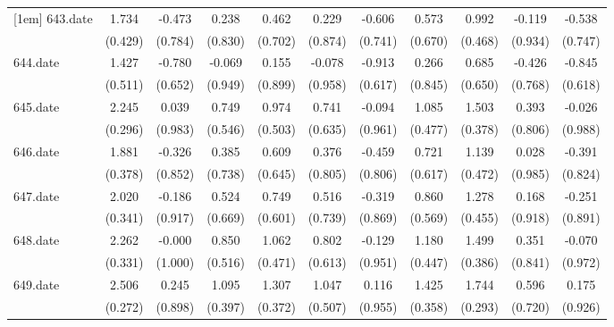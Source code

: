 \begin{tabular}{l*{10}{c}}
[1em]
643.date    &       1.734&      -0.473&       0.238&       0.462&       0.229&      -0.606&       0.573&       0.992&      -0.119&      -0.538\\
            &     (0.429)&     (0.784)&     (0.830)&     (0.702)&     (0.874)&     (0.741)&     (0.670)&     (0.468)&     (0.934)&     (0.747)\\
[1em]
644.date    &       1.427&      -0.780&      -0.069&       0.155&      -0.078&      -0.913&       0.266&       0.685&      -0.426&      -0.845\\
            &     (0.511)&     (0.652)&     (0.949)&     (0.899)&     (0.958)&     (0.617)&     (0.845)&     (0.650)&     (0.768)&     (0.618)\\
[1em]
645.date    &       2.245&       0.039&       0.749&       0.974&       0.741&      -0.094&       1.085&       1.503&       0.393&      -0.026\\
            &     (0.296)&     (0.983)&     (0.546)&     (0.503)&     (0.635)&     (0.961)&     (0.477)&     (0.378)&     (0.806)&     (0.988)\\
[1em]
646.date    &       1.881&      -0.326&       0.385&       0.609&       0.376&      -0.459&       0.721&       1.139&       0.028&      -0.391\\
            &     (0.378)&     (0.852)&     (0.738)&     (0.645)&     (0.805)&     (0.806)&     (0.617)&     (0.472)&     (0.985)&     (0.824)\\
[1em]
647.date    &       2.020&      -0.186&       0.524&       0.749&       0.516&      -0.319&       0.860&       1.278&       0.168&      -0.251\\
            &     (0.341)&     (0.917)&     (0.669)&     (0.601)&     (0.739)&     (0.869)&     (0.569)&     (0.455)&     (0.918)&     (0.891)\\
[1em]
648.date    &       2.262&      -0.000&       0.850&       1.062&       0.802&      -0.129&       1.180&       1.499&       0.351&      -0.070\\
            &     (0.331)&     (1.000)&     (0.516)&     (0.471)&     (0.613)&     (0.951)&     (0.447)&     (0.386)&     (0.841)&     (0.972)\\
[1em]
649.date    &       2.506&       0.245&       1.095&       1.307&       1.047&       0.116&       1.425&       1.744&       0.596&       0.175\\
            &     (0.272)&     (0.898)&     (0.397)&     (0.372)&     (0.507)&     (0.955)&     (0.358)&     (0.293)&     (0.720)&     (0.926)\\

\end{tabular}
